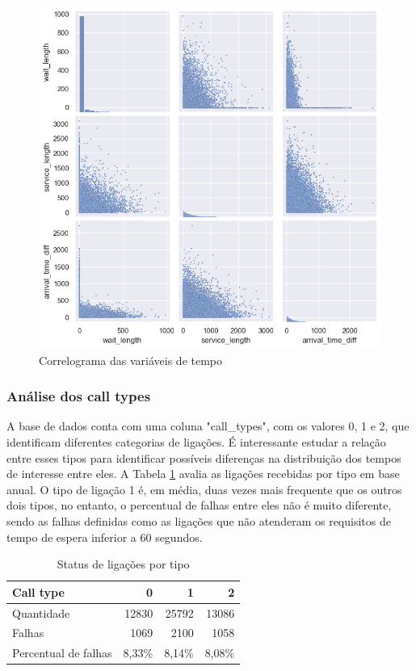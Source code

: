 \begin{figure}[H]
    \includegraphics[scale=0.85]{analise-de-dados/anual/correlograma.png}
    \caption{Correlograma das variáveis de tempo}
    \label{fig: correlogram}
\end{figure}

\subsubsection{Análise dos call types}
A base de dados conta com uma coluna "call\_types", com os valores 0, 1 e 2, que identificam diferentes categorias de ligações. É interessante estudar a relação entre esses tipos para identificar possíveis diferenças na distribuição dos tempos de interesse entre eles. A Tabela \ref*{tab: call-type} avalia as ligações recebidas por tipo em base anual. O tipo de ligação 1 é, em média, duas vezes mais frequente que os outros dois tipos, no entanto, o percentual de falhas entre eles não é muito diferente, sendo as falhas definidas como as ligações que não atenderam os requisitos de tempo de espera inferior a 60 segundos.

\begin{table}[H]
    \centering
    \begin{tabular}{|l|r|r|r|}
    \hline
    \textbf{Call type} & 0 & 1 & 2 \\ \hline
    Quantidade & 12830 & 25792 & 13086 \\ \hline
    Falhas & 1069 & 2100 & 1058 \\ \hline
    Percentual de falhas & 8,33\% & 8,14\% & 8,08\% \\ \hline
    \end{tabular}
    \caption{Status de ligações por tipo}
    \label{tab: call-type}
\end{table}
    
